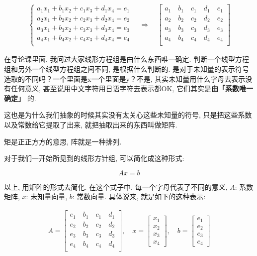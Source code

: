 \begin{align*}
\begin{cases}
a_1x_1 + b_1x_2+ c_1x_3 + d_1x_4 = e_1 \\
a_2x_1 + b_2x_2+ c_2x_3 + d_2x_4 = e_2 \\
a_3x_1 + b_3x_2+ c_3x_3 + d_3x_4 = e_3 \\
a_4x_1 + b_4x_2+ c_4x_3 + d_4x_4 = e_4 \\
\end{cases}
\quad \Longrightarrow \quad
\begin{bmatrix}
a_1 \quad b_1 \quad c_1 \quad d_1 \quad e_1 \\
a_2 \quad b_2 \quad c_2 \quad d_2 \quad e_2 \\
a_3 \quad b_3 \quad c_3 \quad d_3 \quad e_3 \\
a_4 \quad b_4 \quad c_4 \quad d_4 \quad e_4 \\
\end{bmatrix}
\end{align*}


在导论课里面, 我问过大家线形方程组是由什么东西唯一确定. 判断一个线型方程组和另外一个线型方程组之间不同, 是根据什么判断的. 是对于未知量的表示符号选取的不同吗？一个里面是x一个里面是y？不是, 其实未知量用什么字母去表示没有任何意义, 甚至说用中文字符用日语字符去表示都OK, 它们其实是\textbf{由「系数唯一确定」} 的. 

这也是为什么我们抽象的时候其实没有太关心这些未知量的符号, 只是把这些系数以及常数给它提取了出来, 就把抽取出来的东西叫做矩阵. 

矩是正正方方的意思, 阵就是一种排列. 

对于我们一开始所见到的线形方针组, 可以简化成这种形式:

\[
  Ax = b
\]

以上, 用矩阵的形式去简化. 在这个式子中, 每一个字母代表了不同的意义, $A$: 系数矩阵, $x$: 未知量向量, $b$: 常数向量. 具体说来, 就是如下的这种表示: 


\begin{align*}
  A = 
  \begin{bmatrix}
  e_1 \quad b_1 \quad c_1 \quad  d_1\\
  e_2 \quad b_2 \quad c_2 \quad  d_2\\ 
  e_3 \quad b_3 \quad c_3 \quad  d_3\\
  e_4 \quad b_4 \quad c_4 \quad  d_4\\
  \end{bmatrix}, \quad
  x = 
  \begin{bmatrix}
  x_1 \\
  x_2 \\
  x_3 \\
  x_4
  \end{bmatrix}, \quad
  b = 
  \begin{bmatrix}
  e_1 \\
  e_2 \\
  e_3 \\
  e_4
  \end{bmatrix}
\end{align*}


